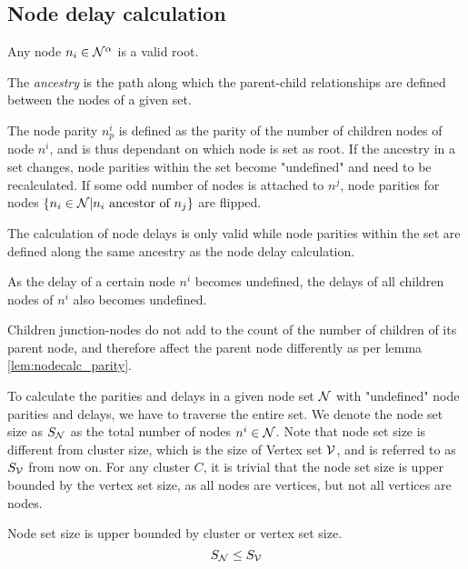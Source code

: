 \subsection{Node delay calculation}


\begin{lemma}
  Any node $n_i \in \mathcal{N}^\alpha$ is a valid root.
\end{lemma}


The \emph{ancestry} is the path along which the parent-child relationships are defined between the nodes of a given set.

\begin{lemma}\label{lem:nodecalc_parity}
  The node parity $n^i_p$ is defined as the parity of the number of children nodes of node $n^i$, and is thus dependant on which node is set as root. If the ancestry in a set changes, node parities within the set become "undefined" and need to be recalculated. If some odd number of nodes is attached to $n^j$, node parities for nodes $\{n_i \in \mathcal{N} | n_i \mbox{ ancestor of } n_j\}$ are flipped.
\end{lemma}


\begin{lemma}\label{lem:nodecalc_ancestrypath}
 The calculation of node delays is only valid while node parities within the set are defined along the same ancestry as the node delay calculation.
\end{lemma}

\begin{lemma}\label{lem:nodecalc_undefineddelay}
  As the delay of a certain node $n^i$ becomes undefined, the delays of all children nodes of $n^i$ also becomes undefined.
\end{lemma}

\begin{lemma}\label{lem:nodecalc_junction}
  Children junction-nodes do not add to the count of the number of children of its parent node, and therefore affect the parent node differently as per lemma \ref{lem:nodecalc_parity}.
\end{lemma}


To calculate the parities and delays in a given node set $\mathcal{N}$ with "undefined" node parities and delays, we have to traverse the entire set. We denote the node set size as $S_{\mathcal{N}}$ as the total number of nodes $n^i \in \mathcal{N}$. Note that node set size is different from cluster size, which is the size of Vertex set $\mathcal{V}$, and is referred to as $S_{\mathcal{V}}$ from now on. For any cluster $C$, it is trivial that the node set size is upper bounded by the vertex set size, as all nodes are vertices, but not all vertices are nodes.
\begin{lemma}\label{lem:upperboundsize}
  Node set size is upper bounded by cluster or vertex set size. 
    \begin{equation}\label{eq:upperboundsize}
      S_{\mathcal{N}} \leq S_{\mathcal{V}}
    \end{equation}
\end{lemma}

